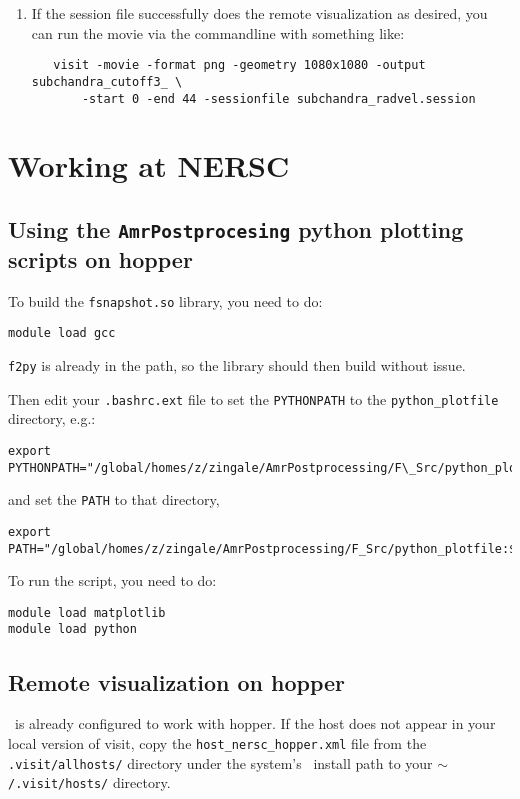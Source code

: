 \begin{itemize}
\begin{enumerate}
  \item If the session file successfully does the remote visualization
   as desired, you can run the movie via the commandline with something like:

   \begin{verbatim}
   visit -movie -format png -geometry 1080x1080 -output subchandra_cutoff3_ \
       -start 0 -end 44 -sessionfile subchandra_radvel.session
   \end{verbatim}

  \end{enumerate}

\end{itemize}


\section{Working at NERSC}


\subsection{Using the {\tt AmrPostprocesing} python plotting scripts on hopper}

To build the {\tt fsnapshot.so} library, you need to do:
\begin{verbatim}
module load gcc
\end{verbatim}
{\tt f2py} is already in the path, so the library should then build without issue.
%

Then edit your {\tt .bashrc.ext} file to set the {\tt PYTHONPATH} to
the {\tt python\_plotfile} directory, e.g.:
\begin{verbatim}
export PYTHONPATH="/global/homes/z/zingale/AmrPostprocessing/F\_Src/python_plotfile"
\end{verbatim}
%
and set the {\tt PATH} to that directory,
\begin{verbatim}
export PATH="/global/homes/z/zingale/AmrPostprocessing/F_Src/python_plotfile:$PATH"
\end{verbatim}

To run the script, you need to do:
\begin{verbatim}
module load matplotlib
module load python
\end{verbatim}



\subsection{Remote visualization on hopper}

\visit\ is already configured to work with hopper.  If the host does not appear
in your local version of visit, copy the {\tt host\_nersc\_hopper.xml} file
from the {\tt .visit/allhosts/} directory under the system's \visit\ install path
to your {\tt $\mathtt{\sim}$/.visit/hosts/} directory. 
